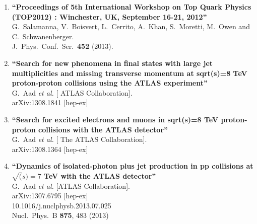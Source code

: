 \documentclass{article}
\begin{document}
\begin{enumerate}


\item%
{\bf ``Proceedings of 5th International Workshop on Top Quark Physics (TOP2012) : Winchester, UK, September 16-21, 2012''}
  \\{}G.~Salamanna, V.~Boisvert, L.~Cerrito, A.~Khan, S.~Moretti, M.~Owen and C.~Schwanenberger.
  \\{}J.\ Phys.\ Conf.\ Ser.\  {\bf 452} (2013). %



\item%
{\bf ``Search for new phenomena in final states with large jet multiplicities and missing transverse momentum at sqrt(s)=8 TeV proton-proton collisions using the ATLAS experiment''}
  \\{}G.~Aad {\it et al.}  [ ATLAS Collaboration].
  \\{}arXiv:1308.1841 [hep-ex]
  


\item%
{\bf ``Search for excited electrons and muons in sqrt(s)=8 TeV proton-proton collisions with the ATLAS detector''}
  \\{}G.~Aad {\it et al.}  [ The ATLAS Collaboration].
  \\{}arXiv:1308.1364 [hep-ex]
  



\item%
{\bf ``Dynamics of isolated-photon plus jet production in pp collisions at $\sqrt(s)=7$ TeV with the ATLAS detector''}
  \\{}G.~Aad {\it et al.}  [ATLAS Collaboration].
  \\{}arXiv:1307.6795 [hep-ex]
    \\{}10.1016/j.nuclphysb.2013.07.025
\\{}Nucl.\ Phys.\ B {\bf 875}, 483 (2013) %




\end{enumerate}
\end{document}
